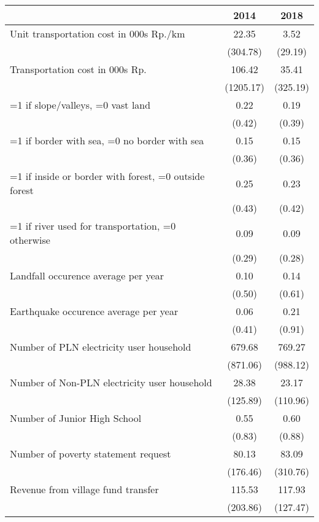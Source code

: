 \begin{tabular}{l*{2}{c}}
\hline\hline
                    &        2014&        2018\\
\hline
Unit transportation cost in 000s Rp./km&       22.35&        3.52\\
                    &    (304.78)&     (29.19)\\
Transportation cost in 000s Rp.&      106.42&       35.41\\
                    &   (1205.17)&    (325.19)\\
=1 if slope/valleys, =0 vast land&        0.22&        0.19\\
                    &      (0.42)&      (0.39)\\
=1 if border with sea, =0 no border with sea&        0.15&        0.15\\
                    &      (0.36)&      (0.36)\\
=1 if inside or border with forest, =0 outside forest&        0.25&        0.23\\
                    &      (0.43)&      (0.42)\\
=1 if river used for transportation, =0 otherwise&        0.09&        0.09\\
                    &      (0.29)&      (0.28)\\
Landfall occurence average per year&        0.10&        0.14\\
                    &      (0.50)&      (0.61)\\
Earthquake occurence average per year&        0.06&        0.21\\
                    &      (0.41)&      (0.91)\\
Number of PLN electricity user household&      679.68&      769.27\\
                    &    (871.06)&    (988.12)\\
Number of Non-PLN electricity user household&       28.38&       23.17\\
                    &    (125.89)&    (110.96)\\
Number of Junior High School&        0.55&        0.60\\
                    &      (0.83)&      (0.88)\\
Number of poverty statement request&       80.13&       83.09\\
                    &    (176.46)&    (310.76)\\
Revenue from village fund transfer&      115.53&      117.93\\
                    &    (203.86)&    (127.47)\\
\hline\hline
\end{tabular}
